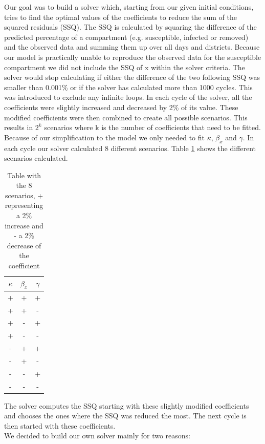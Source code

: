 \documentclass[11pt]{article}
\begin{document}
Our goal was to build a solver which, starting from our given initial conditions, tries to find the optimal values of the coefficients to reduce the sum of the squared residuals (SSQ). The SSQ is calculated by squaring the difference of the predicted percentage of a compartment (e.g. susceptible, infected or removed) and the observed data and summing them up over all days and districts. Because our model is practically unable to reproduce the observed data for the susceptible compartment we did not include the SSQ of x within the solver criteria. The solver would stop calculating if either the difference of the two following SSQ was smaller than 0.001\% or if the solver has calculated more than 1000 cycles. This was introduced to exclude any infinite loops. In each cycle of the solver, all the coefficients were slightly increased and decreased by 2\% of its value. These modified coefficients were then combined to create all possible scenarios. This results in $2^{k}$ scenarios where k is the number of coefficients that need to be fitted. Because of our simplification to the model we only needed to fit $\kappa$, $\beta_{x}$ and $\gamma$. In each cycle our solver calculated 8 different scenarios. Table \ref{tab:solverbuild} shows the different scenarios calculated.



\begin{table}[htb]
\caption{Table with the 8 scenarios, + representing a 2\% increase and - a 2\% decrease of the coefficient }
\centering
\begin{tabular}{|c|c|c|}
\hline 
$\kappa$ & $\beta_{x}$ & $\gamma$ \\ 
\hline 
+ & + & + \\ 
\hline 
+ & + & - \\ 
\hline 
+ & - & + \\ 
\hline 
+ & - & - \\ 
\hline 
- & + & + \\ 
\hline 
- & + & - \\ 
\hline 
- & - & + \\ 
\hline 
- & - & - \\ 
\hline 
\end{tabular} 
\label{tab:solverbuild}
\end{table}




The solver computes the SSQ starting with these slightly modified coefficients and chooses the ones where the SSQ was reduced the most. The next cycle is then started with these coefficients.\\
We decided to build our own solver mainly for two reasons:
\end{document}
